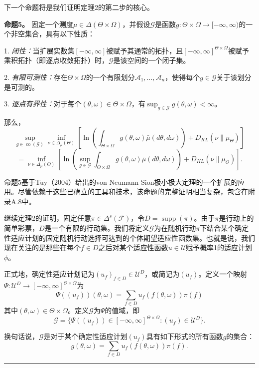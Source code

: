 \documentclass[12pt,a4paper]{article}
\newenvironment{translation}
  {\par\noindent\color{blue!70!black}\smallskip}
  {\par\medskip\hrule\medskip}
\begin{document}
\begin{translation}
下一个命题将是我们证明定理2的第二步的核心。

\textbf{命题5。} 固定一个测度$\mu \in \Delta(\Theta \times \Omega)$，并假设$\mathcal{G}$是函数$g: \Theta \times \Omega \to [-\infty, \infty)$的一个非空集合，具有以下性质：

1. \textit{闭性：}当扩展实数集$[-\infty, \infty]$被赋予其通常的拓扑，且$[-\infty, \infty]^{\Theta \times \Omega}$被赋予乘积拓扑（即逐点收敛拓扑）时，$\mathcal{G}$是该空间的一个闭子集。

2. \textit{有限可测性：}存在$\Theta \times \Omega$的一个有限划分$\mathcal{A}_1, \dots, \mathcal{A}_n$，使得每个$g \in \mathcal{G}$关于该划分是可测的。

3. \textit{逐点有界性：}对于每个$(\theta, \omega) \in \Theta \times \Omega$，有$\sup_{g \in \mathcal{G}} g(\theta, \omega) < \infty$。

那么，
\[
\sup_{g \in \operatorname{co}(\mathcal{G})} \inf_{\nu \in \Delta_\mu(\Theta)} \left[ \ln\left( \int_{\Theta \times \Omega} g(\theta, \omega) \bar{\mu}(d\theta, d\omega) \right) + D_{KL}(\nu\|\mu_\Theta) \right]
\]
\[
= \inf_{\nu \in \Delta_\mu(\Theta)} \left[ \ln\left( \sup_{g \in \mathcal{G}} \int_{\Theta \times \Omega} g(\theta, \omega) \bar{\mu}(d\theta, d\omega) \right) + D_{KL}(\nu\|\mu_\Theta) \right].
\]

命题5基于Tuy（2004）给出的von Neumann-Sion极小极大定理的一个扩展的应用。尽管依赖于这些已确立的工具和技术，该命题的完整证明相当复杂，包含在附录A.8中。

继续定理2的证明，固定任意$\pi \in \Delta^s(\mathcal{F})$，令$D = \operatorname{supp}(\pi)$。由于$\pi$是行动上的简单彩票，$D$是一个有限的行动集。我们将定义$\mathcal{G}$为在随机行动$\pi$下结合某个确定性适应计划的固定随机行动选择可达到的个体期望适应性函数集。也就是说，我们现在关注的是那些在每个$f \in D$之后对某个适应性函数$u \in \mathcal{U}$赋予概率1的适应计划$\phi$。

正式地，确定性适应计划记为$(u_f)_{f \in D} \in \mathcal{U}^D$，或简记为$(u_f)$。定义一个映射$\Psi: \mathcal{U}^D \to [-\infty, \infty]^{\Theta \times \Omega}$为
\[
\Psi((u_f))(\theta, \omega) = \sum_{f \in D} u_f(f(\theta, \omega)) \pi(f)
\]
其中$(\theta, \omega) \in \Theta \times \Omega$。定义$\mathcal{G}$为$\Psi$的值域，即
\[
\mathcal{G} = \{ \Psi((u_f)) \in [-\infty, \infty]^{\Theta \times \Omega} : (u_f) \in \mathcal{U}^D \}.
\]

换句话说，$\mathcal{G}$是对于某个确定性适应计划$(u_f)$具有如下形式的所有函数$g$的集合：
\[
g(\theta, \omega) = \sum_{f \in D} u_f(f(\theta, \omega)) \pi(f).
\]


\end{translation}
\end{document}
